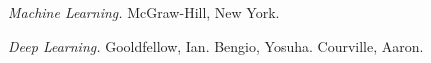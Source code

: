 \documentclass[reqno,twoside, 12pt]{report}
\begin{document}
%







%
\begin{thebibliography}{99}
	 \hspace{-.22cm} \textit{Machine Learning.} McGraw-Hill, New York.
	
	 \hspace{-.22cm} \textit{Deep Learning.} Gooldfellow, Ian. \textbar  Bengio, Yosuha. \textbar	  Courville, Aaron. 

\end{thebibliography}
\end{document}
